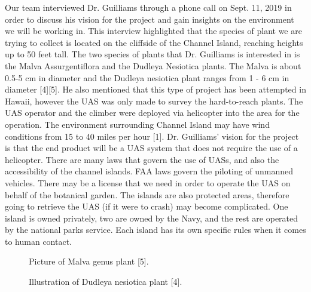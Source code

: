 \documentclass{wrcecapstone}
\begin{document}
Our team interviewed Dr. Guilliams through a phone call on Sept. 11, 2019 in order to discuss his vision for the project and gain insights on the environment we will be working in. This interview highlighted that the species of plant we are trying to collect is located on the cliffside of the Channel Island, reaching heights up to 50 feet tall. The two species of plants that Dr. Guilliams is interested in is the Malva Assurgentiflora and the Dudleya Nesiotica plants. The Malva is about 0.5-5 cm in diameter and the Dudleya nesiotica plant ranges from 1 - 6 cm in diameter [4][5]. He also mentioned that this type of project has been attempted in Hawaii, however the UAS was only made to survey the hard-to-reach plants.  The UAS operator and the climber were deployed via helicopter into the area for the operation. The  environment surrounding Channel Island may have wind conditions from 15 to 40 miles per hour [1].  Dr. Guilliams’ vision for the project is that the end product will be a UAS system that does not require the use of a helicopter.
There are many laws that govern the use of UASs, and also the accessibility of the channel islands.  FAA laws govern the piloting of unmanned vehicles.  There may be a license that we need in order to operate the UAS on behalf of the botanical garden.  The islands are also protected areas, therefore going to retrieve the UAS (if it were to crash) may become complicated.  One island is owned privately, two are owned by the Navy, and the rest are operated by the national parks service.  Each island has its own specific rules when it comes to human contact.
\begin{figure}
\caption{Picture of Malva genus plant [5].}
\end{figure}
\begin{figure}
\caption{Illustration of Dudleya nesiotica plant [4].}
\end{figure}
\end{document}
